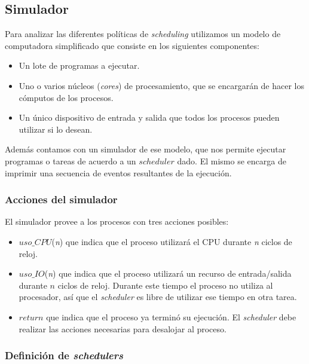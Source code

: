 \subsection{Simulador}

Para analizar las diferentes pol\'iticas de \emph{scheduling} utilizamos un modelo de computadora simplificado que consiste en los siguientes componentes:

\begin{itemize}
	\item Un lote de programas a ejecutar.
	\item Uno o varios n\'ucleos (\emph{cores}) de procesamiento, que se encargar\'an de hacer los c\'omputos de los procesos.
	\item Un \'unico dispositivo de entrada y salida que todos los procesos pueden utilizar si lo desean.
\end{itemize}

Adem\'as contamos con un simulador de ese modelo, que nos permite ejecutar programas o tareas de acuerdo a un $scheduler$ dado. El mismo se encarga de imprimir una secuencia de eventos resultantes de la ejecuci\'on. 

\subsubsection{Acciones del simulador}

El simulador provee a los procesos con tres acciones posibles:

\begin{itemize}
	\item $uso\_CPU$(\emph{n}) que indica que el proceso utilizar\'a el CPU durante \emph{n} ciclos de reloj.
	\item $uso\_IO$(\emph{n}) que indica que el proceso utilizar\'a un recurso de entrada/salida durante $n$ ciclos de reloj. Durante este tiempo el proceso no utiliza al procesador, as\'i que el \emph{scheduler} es libre de utilizar ese tiempo en otra tarea.
	\item $return$ que indica que el proceso ya termin\'o su ejecuci\'on. El \emph{scheduler} debe realizar las acciones necesarias para desalojar al proceso.
\end{itemize}

\subsubsection{Definici\'on de \emph{schedulers}}

